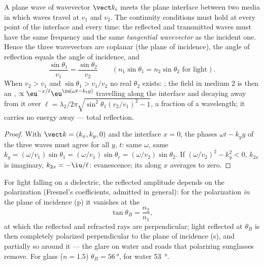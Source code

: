 \begin{theorem}\label{thm:b2:wave-interfaces:snell}
A plane wave of wavevector $\vect k_i$ meets the plane interface between
two media in which waves travel at $v_1$ and $v_2$. The continuity
conditions must hold at every point of the interface and every time:
the reflected and transmitted waves must have the same frequency and
the same \emph{tangential wavevector} as the incident one. Hence the
three wavevectors are coplanar (the plane of incidence), the angle of
reflection equals the angle of incidence, and
\[
\frac{\sin\theta_1}{v_1} = \frac{\sin\theta_2}{v_2} \qquad (n_1\sin\theta_1 = n_2\sin\theta_2 \text{ for light}) .
\]
When $v_2 > v_1$ and $\sin\theta_1 > v_1/v_2$ no real $\theta_2$ exists:
\emph{}; the field in medium 2 is then an
\emph{}, $\propto\eu^{-x/\ell}\eu^{\iu(\omega t - k_ty)}$ travelling
along the interface and decaying away from it over $\ell = \lambda_2/2\pi
\sqrt{\sin^2\theta_1(v_2/v_1)^2 - 1}$, a fraction of a wavelength; it
carries no energy away --- total reflection.
\end{theorem}

\begin{proof}
With $\vect k = (k_x, k_y, 0)$ and the interface $x = 0$, the phases
$\omega t - k_yy$ of the three waves must agree for all $y$, $t$: same
$\omega$, same $k_y = (\omega/v_1)\sin\theta_1 = (\omega/v_1)\sin\theta_r = (\omega/v_2)\sin
\theta_2$. If $(\omega/v_2)^2 - k_y^2 < 0$, $k_{2x}$ is imaginary, $k_{2x} = -\iu/\ell$:
evanescence; its  along $x$ averages to zero.
\end{proof}

\begin{proposition}\label{prop:b2:wave-interfaces:brewster}
For light falling on a dielectric, the reflected amplitude depends on
the polarization (Fresnel's coefficients, admitted in general): for the
polarization \emph{in} the plane of incidence (p) it vanishes at the
\emph{}
\[
\tan\theta_B = \frac{n_2}{n_1} ,
\]
at which the reflected and refracted rays are perpendicular; light
reflected at $\theta_B$ is then completely polarized perpendicular to the
plane of incidence (s), and partially so around it --- the glare on
water and roads that polarizing sunglasses remove. For glass ($n = 1.5$)
$\theta_B = \qty{56}{\degree}$, for water \qty{53}{\degree}.
\end{proposition}

